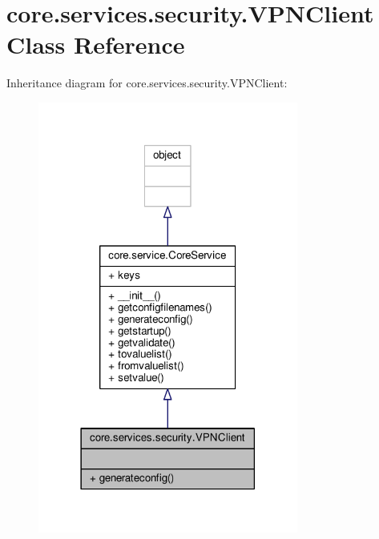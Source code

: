 \hypertarget{classcore_1_1services_1_1security_1_1_v_p_n_client}{\section{core.\+services.\+security.\+V\+P\+N\+Client Class Reference}
\label{classcore_1_1services_1_1security_1_1_v_p_n_client}
}


Inheritance diagram for core.\+services.\+security.\+V\+P\+N\+Client\+:
\nopagebreak
\begin{figure}[H]
\begin{center}
\leavevmode
\includegraphics[width=242pt]{classcore_1_1services_1_1security_1_1_v_p_n_client__inherit__graph}
\end{center}
\end{figure}


